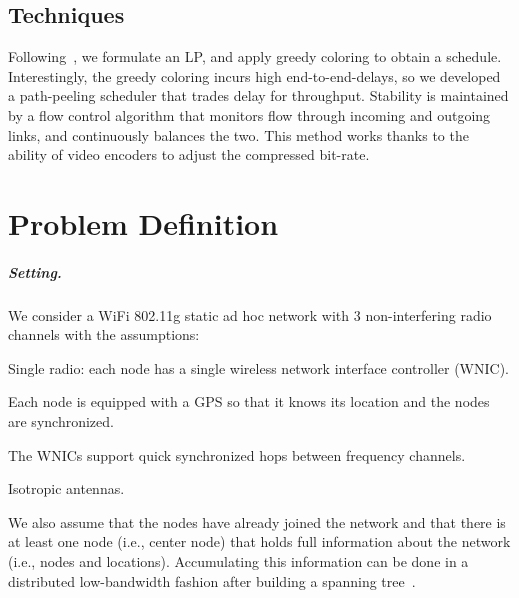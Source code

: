 \documentclass[12pt,oneside,english,a4paper]{book}
\theoremstyle{plain}
\theoremstyle{definition}
\theoremstyle{Theorem}
\theoremstyle{plain}
\newenvironment{proof sketch}[1]{\noindent {\emph{Proof sketch of #1:}}}{\hfill \qed}
\begin{document}
\section{Techniques}
Following~\cite{kumar2005algorithmic,alicherry2005joint11,buragohain2007improved,ChafekarCapacity},
we formulate an LP, and apply greedy coloring to obtain a schedule.
Interestingly, the greedy coloring incurs high end-to-end-delays, so
we developed a path-peeling scheduler that trades delay for
throughput. Stability is maintained by a flow control algorithm that
monitors flow through incoming and outgoing links, and continuously
balances the two. This method works thanks to the ability of video
encoders to adjust the compressed bit-rate.

\chapter{Problem Definition}\label{sec:problem}
\paragraph{Setting.}
We consider a WiFi 802.11g static ad hoc network with $3$ non-interfering radio
channels with the assumptions:
\begin{inparaenum}[(i)]
\item Single radio: each node has a single wireless network interface
  controller (WNIC).
\item Each node is equipped with a GPS so that it knows
  its location and the nodes are synchronized.
\item The WNICs support quick synchronized hops between frequency
  channels.
\item Isotropic antennas.
\item We also assume that the nodes have already joined the network
  and that there is at least one node (i.e., center node) that holds
  full information about the network (i.e., nodes and locations).
  Accumulating this information can be done in a distributed
  low-bandwidth fashion after building a spanning
  tree~\cite{awerbuch1987optimal}.
\end{inparaenum}
\end{document}
